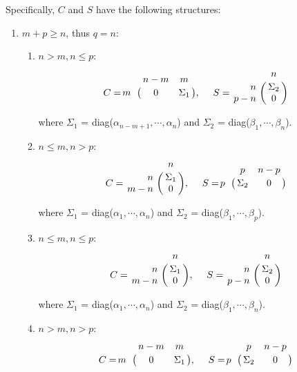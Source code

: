         Specifically, $C$ and $S$ have the following structures:
        \begin{enumerate}
            \item $m + p \geq n$, thus $q = n$:
                \begin{enumerate}
                    \item $n > m, n \leq p$:
                        \begin{displaymath}
                            C = \bordermatrix{ & n-m & m   \cr
                            \hfill m & 0 & \Sigma_1}, \  \ \ \
                            S = \bordermatrix{ & n  \cr
                            \hfill n & \Sigma_2 \cr
                            \hfill p-n & 0 }
                         \end{displaymath}
                         
                        where $\Sigma_1$ = diag($\alpha_{n-m+1}, \cdots, \alpha_{n}$) and $\Sigma_2$ = diag($\beta_1, \cdots, \beta_n$).
                    \item $n \leq m, n > p$:
                        \begin{displaymath}
                            C = \bordermatrix{ & n  \cr
                            \hfill n & \Sigma_1 \cr
                            \hfill m-n & 0 }, \ \ \ \
                            S = \bordermatrix{ & p & n-p   \cr
                            \hfill p & \Sigma_2 & 0}
                        \end{displaymath}
                        
                        where $\Sigma_1$ = diag($\alpha_1, \cdots, \alpha_{n}$) and $\Sigma_2$ = diag($\beta_1, \cdots, \beta_p$).
                    \item $n \leq m, n \leq p$:
                        \begin{displaymath}
                            C = \bordermatrix{ & n  \cr
                            \hfill n & \Sigma_1 \cr
                            \hfill m-n & 0 }, \ \ \ \
                            S = \bordermatrix{ & n  \cr
                            \hfill n & \Sigma_2 \cr
                            \hfill p-n & 0 }
                        \end{displaymath}
                        
                        where $\Sigma_1$ = diag($\alpha_1, \cdots, \alpha_{n}$) and $\Sigma_2$ = diag($\beta_1, \cdots, \beta_n$).
                    
                    \item $n > m, n > p$:
                        \begin{displaymath}
                            C = \bordermatrix{ & n-m & m   \cr
                            \hfill m & 0 & \Sigma_1}, \  \ \ \
                            S = \bordermatrix{ & p & n-p   \cr
                            \hfill p & \Sigma_2 & 0}
                        \end{displaymath}
                        

\end{enumerate}
\end{enumerate}
